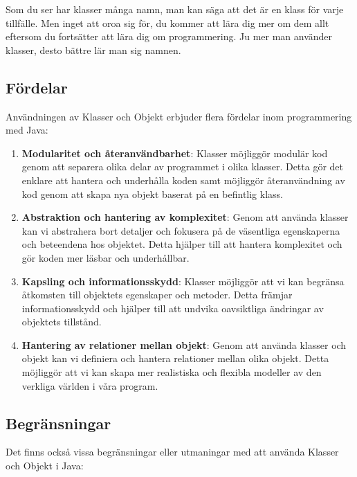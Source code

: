 Som du ser har klasser många namn, man kan säga att det är en klass för
varje tillfälle. Men inget att oroa sig för, du kommer att lära dig mer
om dem allt eftersom du fortsätter att lära dig om programmering. Ju mer
man använder klasser, desto bättre lär man sig namnen.

\hypertarget{fuxf6rdelar}{%
\subsection{Fördelar}\label{fuxf6rdelar}}

Användningen av Klasser och Objekt erbjuder flera fördelar inom
programmering med Java:

\begin{enumerate}
\def\labelenumi{\arabic{enumi}.}
\item
  \textbf{Modularitet och återanvändbarhet}: Klasser möjliggör modulär
  kod genom att separera olika delar av programmet i olika klasser.
  Detta gör det enklare att hantera och underhålla koden samt möjliggör
  återanvändning av kod genom att skapa nya objekt baserat på en
  befintlig klass.
\item
  \textbf{Abstraktion och hantering av komplexitet}: Genom att använda
  klasser kan vi abstrahera bort detaljer och fokusera på de väsentliga
  egenskaperna och beteendena hos objektet. Detta hjälper till att
  hantera komplexitet och gör koden mer läsbar och underhållbar.
\item
  \textbf{Kapsling och informationsskydd}: Klasser möjliggör att vi kan
  begränsa åtkomsten till objektets egenskaper och metoder. Detta
  främjar informationsskydd och hjälper till att undvika oavsiktliga
  ändringar av objektets tillstånd.
\item
  \textbf{Hantering av relationer mellan objekt}: Genom att använda
  klasser och objekt kan vi definiera och hantera relationer mellan
  olika objekt. Detta möjliggör att vi kan skapa mer realistiska och
  flexibla modeller av den verkliga världen i våra program.
\end{enumerate}

\hypertarget{begruxe4nsningar}{%
\subsection{Begränsningar}\label{begruxe4nsningar}}

Det finns också vissa begränsningar eller utmaningar med att använda
Klasser och Objekt i Java:

